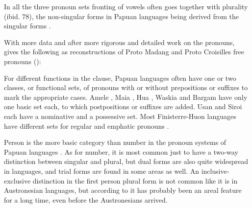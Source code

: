 \largerpage
In all the three pronoun sets fronting of vowels often goes together with plurality (ibid. 78), the non-singular forms in Papuan languages being derived from the singular forms \citep[361]{Franklin1979}. 

With more data and after more rigorous and detailed work on the  pronouns, \citet[5]{Ross1995} gives the following as reconstructions of Proto Madang and Proto Croisilles free pronouns ():

\begin{table}
\caption{Proto Madang and Proto Croisilles free pronouns}
\label{protomadang}


\end{table}

For different functions in the clause, Papuan languages often have one or two classes, or functional sets, of pronouns with or without prepositions or suffixes to mark the appropriate cases. Amele \citep{Roberts1987}, Maia \citep[71]{Hardin2002}, Hua \citep[215]{Haiman1980}, Waskia \citep[53]{RossEtAl1978}%
 and Bargam \citep[29]{Hepner2002} have only one basic set each, to which postpositions or suffixes are added. Usan \citep{Reesink1987} and Siroi \citep{Wells1979} each have a nominative and a possessive set. Most Finisterre-Huon languages have different sets for regular and emphatic pronouns \citep{McElhanon1973}.

Person is the more basic category than number in the pronoun systems of Papuan languages \citep[69]{Foley1986}. As for number, it is most common just to have a two-way distinction between singular and plural, but dual forms are also quite widespread in  languages, and trial forms are found in some areas as well. An inclusive-exclusive distinction in the first person plural form is not common \citep[60]{Wurm1982} like it is in Austronesian languages, but according to \citet[56]{Ross2005} it has probably been an areal feature for a long time, even before the Austronesians arrived. 

